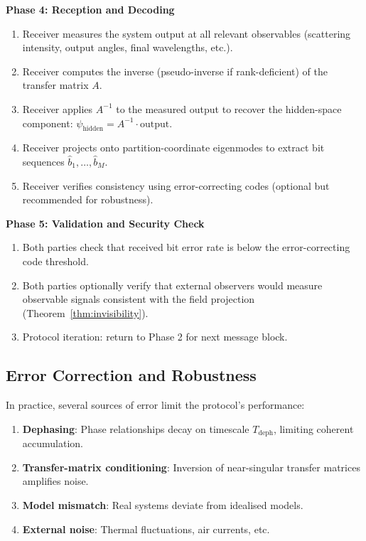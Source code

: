 \documentclass[11pt,twocolumn,a4paper]{article}
\theoremstyle{definition}
\begin{document}
\begin{protocol}
\textbf{Phase 4: Reception and Decoding}

\begin{enumerate}[nosep,label=4.\arabic*]
\item Receiver measures the system output at all relevant observables (scattering intensity, output angles, final wavelengths, etc.).
\item Receiver computes the inverse (pseudo-inverse if rank-deficient) of the transfer matrix $A$.
\item Receiver applies $A^{-1}$ to the measured output to recover the hidden-space component: $\psi_{\text{hidden}} = A^{-1} \cdot \text{output}$.
\item Receiver projects onto partition-coordinate eigenmodes to extract bit sequences $\hat{b}_1, \ldots, \hat{b}_M$.
\item Receiver verifies consistency using error-correcting codes (optional but recommended for robustness).
\end{enumerate}

\textbf{Phase 5: Validation and Security Check}

\begin{enumerate}[nosep,label=5.\arabic*]
\item Both parties check that received bit error rate is below the error-correcting code threshold.
\item Both parties optionally verify that external observers would measure observable signals consistent with the field projection (Theorem~\ref{thm:invisibility}).
\item Protocol iteration: return to Phase 2 for next message block.
\end{enumerate}

\end{protocol}

\subsection{Error Correction and Robustness}

In practice, several sources of error limit the protocol's performance:

\begin{enumerate}[nosep]
\item \textbf{Dephasing}: Phase relationships decay on timescale $T_{\text{deph}}$, limiting coherent accumulation.
\item \textbf{Transfer-matrix conditioning}: Inversion of near-singular transfer matrices amplifies noise.
\item \textbf{Model mismatch}: Real systems deviate from idealised models.
\item \textbf{External noise}: Thermal fluctuations, air currents, etc.
\end{enumerate}
\end{document}
